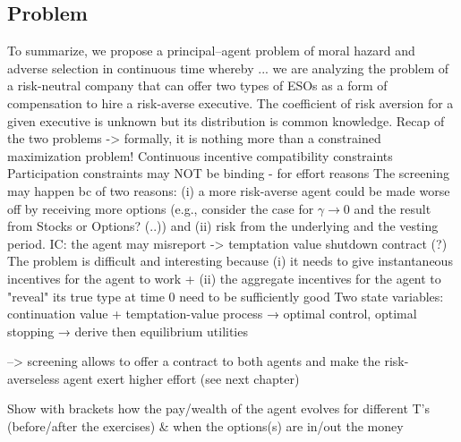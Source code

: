 \subsection{Problem}
To summarize, we propose a principal–agent problem of moral hazard and adverse selection in continuous time whereby ... we are analyzing the problem of a risk-neutral company that can offer two types of ESOs as a form of compensation to hire a risk-averse executive. The coefficient of risk aversion for a given executive is unknown but its distribution is common knowledge.
Recap of the two problems
-> formally, it is nothing more than a constrained maximization problem!
Continuous incentive compatibility constraints
Participation constraints may NOT be binding - for effort reasons
The screening may happen bc of two reasons: (i) a more risk-averse agent could be made worse off by receiving more options (e.g., consider the case for $\gamma \rightarrow 0$ and the result from Stocks or Options? (..)) and (ii) risk from the underlying and the vesting period.
IC: the agent may misreport -> temptation value
shutdown contract (?)
The problem is difficult and interesting because (i) it needs to give instantaneous incentives for the agent to work + (ii) the aggregate incentives for the agent to "reveal" its true type at time 0 need to be sufficiently good
Two state variables: continuation value + temptation-value process
→ optimal control, optimal stopping → derive then equilibrium utilities

--> screening allows to offer a contract to both agents and make the risk-averseless agent exert higher effort (see next chapter)

Show with brackets how the pay/wealth of the agent evolves for different T's (before/after the exercises) \& when the options(s) are in/out the money






